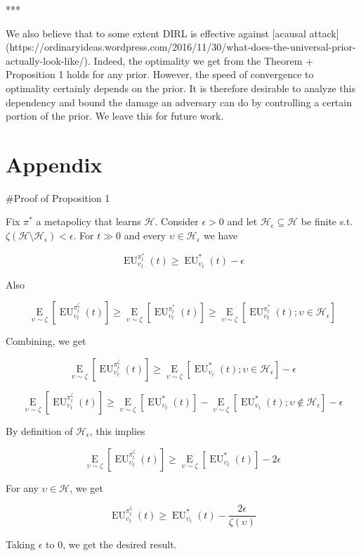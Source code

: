 \documentclass[a4paper]{article}
\newcommand{\E}[1]{\underset{#1}{\operatorname{E}}}
\newcommand{\Hy}{\mathcal{H}}
\newcommand{\EU}{\operatorname{EU}}
\begin{document}
***

We also believe that to some extent DIRL is effective against [acausal attack](https://ordinaryideas.wordpress.com/2016/11/30/what-does-the-universal-prior-actually-look-like/). Indeed, the optimality we get from the Theorem + Proposition 1 holds for any prior. However, the speed of convergence to optimality certainly depends on the prior.  It is therefore desirable to analyze this dependency and bound the damage an adversary can do by controlling a certain portion of the prior. We leave this for future work.

\section{Appendix}

\#Proof of Proposition 1

Fix $\pi^*$ a metapolicy that learns $\Hy$. Consider $\epsilon > 0$ and let $\Hy_\epsilon \subseteq \Hy$ be finite s.t. $\zeta(\Hy \setminus \Hy_\epsilon) < \epsilon$. For $t \gg 0$ and every $\upsilon \in \Hy_\epsilon$ we have

$$\EU_{\upsilon_t}^{\pi^*_t}(t) \geq \EU_{\upsilon_t}^{*}(t) - \epsilon$$

Also

$$\E{\upsilon \sim \zeta}[\EU_{\upsilon_t}^{\pi^\zeta_t}(t)] \geq \E{\upsilon \sim \zeta}[\EU_{\upsilon_t}^{\pi^*_t}(t)] \geq \E{\upsilon \sim \zeta}[\EU_{\upsilon_t}^{\pi^*_t}(t); \upsilon \in \Hy_\epsilon]$$

Combining, we get

$$\E{\upsilon \sim \zeta}[\EU_{\upsilon_t}^{\pi^\zeta_t}(t)] \geq \E{\upsilon \sim \zeta}[\EU_{\upsilon_t}^{*}(t); \upsilon \in \Hy_\epsilon] - \epsilon$$

$$\E{\upsilon \sim \zeta}[\EU_{\upsilon_t}^{\pi^\zeta_t}(t)] \geq \E{\upsilon \sim \zeta}[\EU_{\upsilon_t}^{*}(t)] -  \E{\upsilon \sim \zeta}[\EU_{\upsilon_t}^{*}(t); \upsilon \not\in \Hy_\epsilon] - \epsilon$$

By definition of $\Hy_\epsilon$, this implies

$$\E{\upsilon \sim \zeta}[\EU_{\upsilon_t}^{\pi^\zeta_t}(t)] \geq \E{\upsilon \sim \zeta}[ \EU_{\upsilon_t}^{*}(t)] -  2\epsilon$$

For any $\upsilon \in \Hy$, we get

$$\EU_{\upsilon_t}^{\pi^\zeta_t}(t) \geq \EU_{\upsilon_t}^{*}(t) - \frac{2\epsilon}{\zeta(\upsilon)}$$

Taking $\epsilon$ to 0, we get the desired result.
\end{document}
